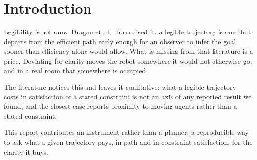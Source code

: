\documentclass[sigconf,nonacm]{acmart}
\begin{document}


\maketitle

\section{Introduction}

Legibility is not ours. Dragan et al.~\cite{dragan2013legibility}
formalised it: a legible trajectory is one that departs from the
efficient path early enough for an observer to infer the goal sooner
than efficiency alone would allow. What is missing from that literature
is a price. Deviating for clarity moves the robot somewhere it would not
otherwise go, and in a real room that somewhere is occupied.

The literature notices this and leaves it qualitative: what a legible
trajectory costs in satisfaction of a stated constraint is not an axis of
any reported result we found, and the closest case reports proximity to
moving agents rather than a stated constraint.

This report contributes an instrument rather than a planner: a
reproducible way to ask what a given trajectory pays, in path and in
constraint satisfaction, for the clarity it buys.
\end{document}
